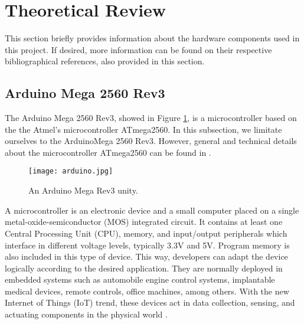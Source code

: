 %
%
%
%


\section{Theoretical Review}
\label{sec:state-of-art}

This section briefly provides information about the hardware components used in
this project. If desired, more information can be found on their respective
bibliographical references, also provided in this section.

\subsection{Arduino Mega 2560 Rev3}
\label{subsec:arduino}

The Arduino Mega 2560 Rev3, showed in Figure \ref{fig:arduino}, is a microcontroller based on the the Atmel's 
microcontroller ATmega2560. In this subsection, we limitate ourselves to the 
ArduinoMega 2560 Rev3. However, general and technical details about the
microcontroller ATmega2560 can be found in \cite{arduinospecs}.

\begin{figure}[h!]
    \centering
    \texttt{[image: arduino.jpg]}
    \caption{An Arduino Mega Rev3 unity.}
    \label{fig:arduino}
\end{figure}

A microcontroller is an electronic device and a small computer placed on a single
metal-oxide-semiconductor (MOS) integrated circuit. It contains at least one
Central Processing Unit (CPU), memory, and input/output peripherals which
interface in different voltage levels, typically 3.3V and 5V. Program memory is
also included in this type of device. This way, developers can adapt the device logically according to the desired application. They are normally deployed in
embedded systems such as automobile engine control systems, implantable medical
devices, remote controls, office machines, among others. With the new Internet of Things
(IoT) trend, these devices act in data collection, sensing, and actuating
components in the physical world \cite{microcontroller}.

